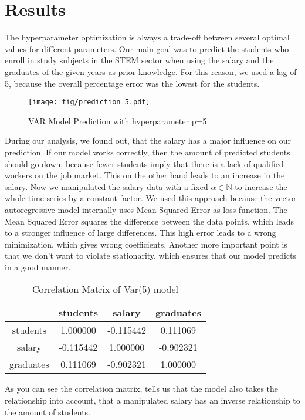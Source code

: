 \documentclass{article}
\theoremstyle{plain}
\theoremstyle{definition}
\theoremstyle{remark}
\begin{document}
\section{Results}\label{sec:results}
The hyperparameter optimization is always a trade-off between several optimal values for different parameters. 
Our main goal was to predict the students who enroll in study subjects in the STEM sector when using the salary and the
graduates of the given years as prior knowledge. For this reason, we used a lag of 5, because the overall percentage error
was the lowest for the students.
\begin{figure}[ht]
    \texttt{[image: fig/prediction\_5.pdf]}
    \caption{VAR Model Prediction with hyperparameter p=5}
\end{figure}
During our analysis, we found out, that the salary has a major influence on our prediction. If our model works correctly, then the amount
of predicted students should go down, because fewer students imply that there is a lack of qualified workers on the job market.
This on the other hand leads to an increase in the salary. Now we manipulated the salary data with a fixed $\alpha\in \mathbb{N}$ to increase
the whole time series by a constant factor. We used this approach because the vector autoregressive model internally uses Mean Squared Error as loss function.
The Mean Squared Error squares the difference between the data points, which leads to a stronger influence of large differences.
This high error leads to a wrong minimization, which gives wrong coefficients.
Another more important point is that we don't want to violate stationarity, which ensures that our model predicts in a good manner.\\
\begin{table}[H]
    \centering
    \begin{tabular}{c|c|c|c}
        & students & salary & graduates\\
        \hline
        students & 1.000000 & -0.115442 &  0.111069\\
        \hline
        salary & -0.115442 & 1.000000 & -0.902321\\
        \hline
        graduates & 0.111069 & -0.902321 &  1.000000\\
    \end{tabular}
    \caption{Correlation Matrix of Var(5) model}
\end{table}

As you can see the correlation matrix, tells us that the model also takes the relationship into account, that a 
manipulated salary has an inverse relationship to the amount of students.
\end{document}
